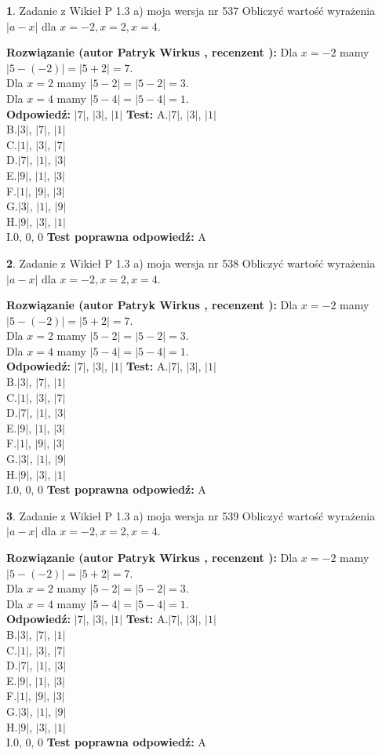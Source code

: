 \documentclass[12pt, a4paper]{article}
\theoremstyle{definition} %
\newtheorem{zad}{}
\newcommand{\zadStart}[1]{\begin{zad}#1\newline}
\newcommand{\zadStop}{\end{zad}}
\newcommand{\rozwStart}[2]{\noindent \textbf{Rozwiązanie (autor #1 , recenzent #2): }\newline}
\newcommand{\rozwStop}{\newline}
\newcommand{\odpStart}{\noindent \textbf{Odpowiedź:}\newline}
\newcommand{\odpStop}{\newline}
\newcommand{\testStart}{\noindent \textbf{Test:}\newline}
\newcommand{\testStop}{\newline}
\newcommand{\kluczStart}{\noindent \textbf{Test poprawna odpowiedź:}\newline}
\newcommand{\kluczStop}{\newline}
\begin{document}
\zadStart{Zadanie z Wikieł P 1.3 a) moja wersja nr 537}
Obliczyć wartość wyrażenia $|a - x|$ dla $x=-2,x=2,x=4$.
\zadStop
\rozwStart{Patryk Wirkus}{}
Dla $x = -2$ mamy $|5 - (-2)| = |5 + 2| = 7$.\\
Dla $x = 2$ mamy $|5 - 2| = |5 - 2| = 3$.\\
Dla $x = 4$ mamy $|5 - 4| = |5 - 4| = 1$.\\
\rozwStop
\odpStart
$|7|$, $|3|$, $|1|$
\odpStop
\testStart
A.$|7|$, $|3|$, $|1|$\\
B.$|3|$, $|7|$, $|1|$\\
C.$|1|$, $|3|$, $|7|$\\
D.$|7|$, $|1|$, $|3|$\\
E.$|9|$, $|1|$, $|3|$\\
F.$|1|$, $|9|$, $|3|$\\
G.$|3|$, $|1|$, $|9|$\\
H.$|9|$, $|3|$, $|1|$\\
I.$0$, $0$, $0$
\testStop
\kluczStart
A
\kluczStop



\zadStart{Zadanie z Wikieł P 1.3 a) moja wersja nr 538}
Obliczyć wartość wyrażenia $|a - x|$ dla $x=-2,x=2,x=4$.
\zadStop
\rozwStart{Patryk Wirkus}{}
Dla $x = -2$ mamy $|5 - (-2)| = |5 + 2| = 7$.\\
Dla $x = 2$ mamy $|5 - 2| = |5 - 2| = 3$.\\
Dla $x = 4$ mamy $|5 - 4| = |5 - 4| = 1$.\\
\rozwStop
\odpStart
$|7|$, $|3|$, $|1|$
\odpStop
\testStart
A.$|7|$, $|3|$, $|1|$\\
B.$|3|$, $|7|$, $|1|$\\
C.$|1|$, $|3|$, $|7|$\\
D.$|7|$, $|1|$, $|3|$\\
E.$|9|$, $|1|$, $|3|$\\
F.$|1|$, $|9|$, $|3|$\\
G.$|3|$, $|1|$, $|9|$\\
H.$|9|$, $|3|$, $|1|$\\
I.$0$, $0$, $0$
\testStop
\kluczStart
A
\kluczStop



\zadStart{Zadanie z Wikieł P 1.3 a) moja wersja nr 539}
Obliczyć wartość wyrażenia $|a - x|$ dla $x=-2,x=2,x=4$.
\zadStop
\rozwStart{Patryk Wirkus}{}
Dla $x = -2$ mamy $|5 - (-2)| = |5 + 2| = 7$.\\
Dla $x = 2$ mamy $|5 - 2| = |5 - 2| = 3$.\\
Dla $x = 4$ mamy $|5 - 4| = |5 - 4| = 1$.\\
\rozwStop
\odpStart
$|7|$, $|3|$, $|1|$
\odpStop
\testStart
A.$|7|$, $|3|$, $|1|$\\
B.$|3|$, $|7|$, $|1|$\\
C.$|1|$, $|3|$, $|7|$\\
D.$|7|$, $|1|$, $|3|$\\
E.$|9|$, $|1|$, $|3|$\\
F.$|1|$, $|9|$, $|3|$\\
G.$|3|$, $|1|$, $|9|$\\
H.$|9|$, $|3|$, $|1|$\\
I.$0$, $0$, $0$
\testStop
\kluczStart
A
\kluczStop
\end{document}

